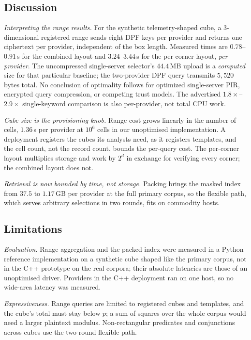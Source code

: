 \documentclass[a4paper,fleqn]{cas-sc}
\newif\ifauthorchecks
\newcommand{\authorcheck}[1]{\ifauthorchecks{\color{red}\textsf{[Authors: #1]}}\fi}
\begin{document}
\subsection{Discussion}
\emph{Interpreting the range results.}
For the synthetic telemetry-shaped cube, a $3$-dimensional
registered range sends eight DPF keys per provider
and returns one ciphertext per provider, independent of the box
length. Measured times are $0.78$--$0.91$\,s for
the combined layout and $3.24$--$3.44$\,s
for the per-corner layout, \emph{per provider}.
The uncompressed single-server selector's $44.4$\,MB
upload is a \emph{computed} size for that particular baseline;
the two-provider DPF query transmits $5{,}520$ bytes total.
No conclusion of optimality follows for optimized single-server PIR,
encrypted query compression, or competing trust models.
The advertised $1.8\times$--$2.9\times$ single-keyword
comparison is also per-provider, not total CPU work.

\emph{Cube size is the provisioning knob.} Range cost grows linearly in the
number of cells, $1.36$\,s per provider at $10^6$ cells in our unoptimised
implementation. A deployment registers the cubes its analysts need, as it
registers templates, and the cell count, not the record count, bounds the
per-query cost. The per-corner layout multiplies storage and work by $2^d$ in
exchange for verifying every corner; the combined layout does not.

\emph{Retrieval is now bounded by time, not storage.} Packing brings the masked
index from $37.5$ to $1.17$\,GB per provider at the full primary corpus, so the
flexible path, which serves arbitrary selections in two rounds, fits on
commodity hosts.

\subsection{Limitations}
\label{sec:limits}
\emph{Evaluation.} Range aggregation and the packed index were measured in a
Python reference implementation on a synthetic cube shaped like the primary
corpus, not in the C++ prototype on the real corpora; their absolute latencies
are those of an unoptimised driver. Providers in the C++ deployment ran on one
host, so no wide-area latency was measured. \authorcheck{Port range
aggregation to the C++ build, measure it on both real corpora, and run the
deployment with providers in at least two cloud regions.}

\emph{Expressiveness.} Range queries are limited to registered cubes and
templates, and the cube's total must stay below $p$; a sum of squares over the
whole corpus would need a larger plaintext modulus. Non-rectangular predicates
and conjunctions across cubes use the two-round flexible path.
\end{document}
